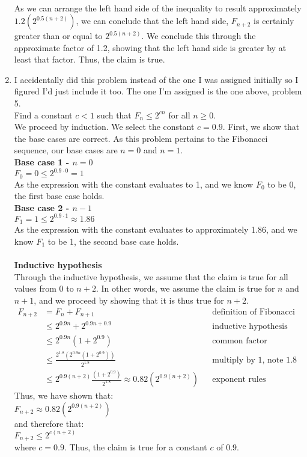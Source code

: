 \documentclass{article}
\begin{document}
\begin{enumerate}
\begin{align}
\end{align}
As we can arrange the left hand side of the inequality to result approximately $1.2(2^{0.5(n+2)})$, we can conclude that the left hand side, $F_{n+2}$ is certainly greater than or equal to $2^{0.5(n+2)}$. We conclude this through the approximate factor of 1.2, showing that the left hand side is greater by at least that factor. Thus, the claim is true.
\item I accidentally did this problem instead of the one I was assigned initially so I figured I'd just include it too. The one I'm assigned is the one above, problem 5. 
\\Find a constant $c<1$ such that $F_n \leq 2^{cn}$ for all $n\geq 0$.
\\ We proceed by induction. We select the constant $c=0.9$. First, we show that the base cases are correct. As this problem pertains to the Fibonacci sequence, our base cases are $n=0$ and $n=1$. 
\\ \textbf{Base case 1 - $n=0$}\\
$F_0=0\leq 2^{0.9\cdot0}=1$ \\
As the expression with the constant evaluates to 1, and we know $F_0$ to be 0, the first base case holds.
\\ \textbf{Base case 2 - $n-1$}\\
$F_1=1\leq 2^{0.9\cdot1}\approx1.86$ \\
As the expression with the constant evaluates to approximately 1.86, and we know $F_1$ to be 1, the second base case holds.
\\
\\ \textbf{Inductive hypothesis}
\\ Through the inductive hypothesis, we assume that the claim is true for all values from $0$ to $n+2$. In other words, we assume the claim is true for $n$ and $n+1$, and we proceed by showing that it is thus true for $n+2$.
\begin{align}
	F_{n+2}&=F_{n}+F_{n+1} && \text{definition of Fibonacci} \\
	&\leq 2^{0.9n}+2^{0.9n+0.9} && \text{inductive hypothesis} \\
	&\leq 2^{0.9n}(1+2^{0.9}) && \text{common factor} \\
	&\leq \frac{2^{1.8}(2^{0.9n}(1+2^{0.9}))}{2^{1.8}} && \text{multiply by 1, note 1.8 = 2c} \\
	&\leq 2^{0.9(n+2)}\frac{(1+2^{0.9})}{2^1.8}\approx 0.82(2^{0.9(n+2)}) && \text{exponent rules}	
\end{align}
Thus, we have shown that: \\
$F_{n+2}\approx 0.82(2^{0.9(n+2)})$ \\
and therefore that: \\
$F_{n+2}\leq2^{c(n+2)}$ \\
where $c=0.9$. Thus, the claim is true for a constant $c$ of $0.9$.
\end{enumerate}
\end{document}
